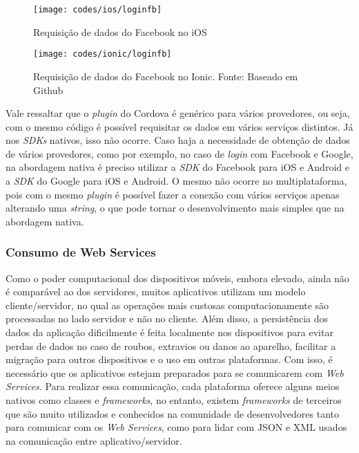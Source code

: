\begin{figure}[H]
	\centering
	\texttt{[image: codes/ios/loginfb]}
	\caption[Requisição de dados do Facebook no iOS]{Requisição de dados do Facebook no iOS}
	\label{fig:loginfb-ios}
\end{figure}

\begin{figure}[H]
	\centering
	\texttt{[image: codes/ionic/loginfb]}
	\caption[Requisição de dados do Facebook no Ionic]{Requisição de dados do Facebook no Ionic. Fonte: Baseado em Github\protect\footnotemark}
	\label{fig:loginfb-ionic}
\end{figure}


Vale ressaltar que o \textit{plugin} do Cordova é genérico para vários provedores, ou seja, com o mesmo código é possível requisitar os dados em vários serviços distintos. Já nos \textit{SDKs} nativos, isso não ocorre.
Caso haja a necessidade de obtenção de dados de vários provedores, como por exemplo, no caso de \textit{login} com Facebook e Google, na abordagem nativa é preciso utilizar a \textit{SDK} do Facebook para iOS e Android
e a \textit{SDK} do Google para iOS e Android. O mesmo não ocorre no multiplataforma, pois com o mesmo \textit{plugin} é possível fazer a conexão com vários serviços apenas alterando uma \textit{string}, 
o que pode tornar o desenvolvimento mais simples que na abordagem nativa.

\subsubsection{Consumo de Web Services} \label{subsubsec:webservices}
Como o poder computacional dos dispositivos móveis, embora elevado, ainda não é comparável ao dos servidores, muitos aplicativos utilizam um modelo cliente/servidor, no qual
as operações mais custosas computacionamente são processadas no lado servidor e não no cliente. Além disso, a persistência dos dados da aplicação dificilmente é feita localmente nos dispositivos para evitar 
perdas de dados no caso de roubos, extravios ou danos ao aparelho, facilitar a migração para outros dispositivos e o uso em outras plataformas. Com isso, é necessário que os aplicativos estejam preparados para se 
comunicarem com \textit{Web Services}. Para realizar essa comunicação, cada plataforma oferece alguns meios nativos como classes e \textit{frameworks}, no entanto, existem \textit{frameworks} de terceiros que 
são muito utilizados e conhecidos na comunidade de desenvolvedores tanto para comunicar com os \textit{Web Services}, como para lidar com JSON e XML usados na comunicação entre aplicativo/servidor. 

